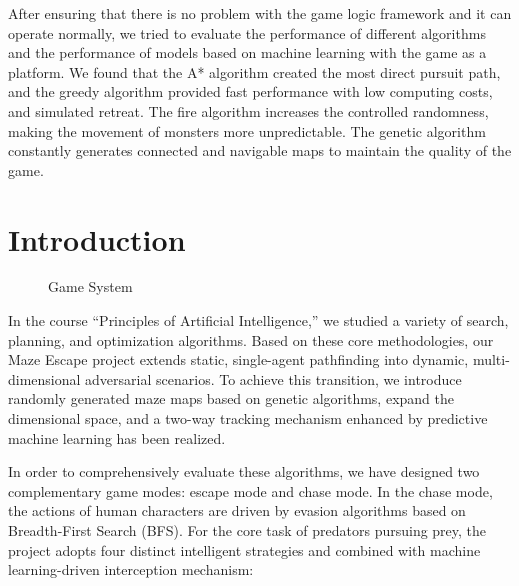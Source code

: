 \documentclass[12pt,a4paper]{article}
\newcommand{\imageplaceholder}[2][4cm]{%
    \fbox{%
        \parbox[c][#1][c]{0.85\linewidth}{%
            \centering
            \textbf{Image Placeholder}\\[0.25cm]
            \texttt{\detokenize{#2}}%
        }%
    }%
}
\begin{document}
After ensuring that there is no problem with the game logic framework and it can operate normally, we tried to evaluate the performance of different algorithms and the performance of models based on machine learning with the game as a platform. We found that the A* algorithm created the most direct pursuit path, and the greedy algorithm provided fast performance with low computing costs, and simulated retreat. The fire algorithm increases the controlled randomness, making the movement of monsters more unpredictable. The genetic algorithm constantly generates connected and navigable maps to maintain the quality of the game.

\section{Introduction}

\begin{figure}[htbp]
    \centering
    \imageplaceholder{system.png}
    \caption{Game System}
    \label{GameSystem}
\end{figure}

In the course ``Principles of Artificial Intelligence,'' we studied a variety of search, planning, and optimization algorithms. Based on these core methodologies, our Maze Escape project extends static, single-agent pathfinding into dynamic, multi-dimensional adversarial scenarios. To achieve this transition, we introduce randomly generated maze maps based on genetic algorithms, expand the dimensional space, and a two-way tracking mechanism enhanced by predictive machine learning has been realized.

In order to comprehensively evaluate these algorithms, we have designed two complementary game modes: escape mode and chase mode. In the chase mode, the actions of human characters are driven by evasion algorithms based on Breadth-First Search (BFS). For the core task of predators pursuing prey, the project adopts four distinct intelligent strategies and combined with machine learning-driven interception mechanism:
\end{document}
